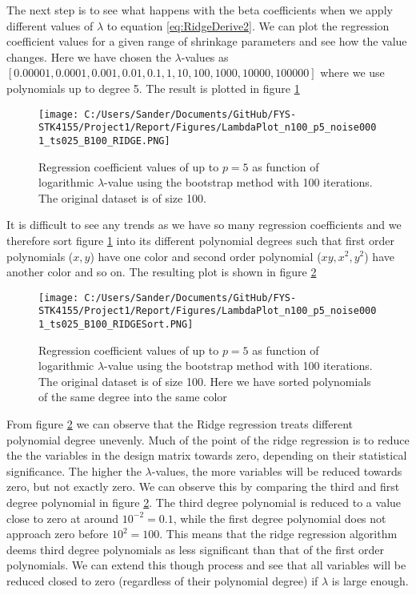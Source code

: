 \documentclass[12pt,a4paper]{article}
\begin{document}
\noindent The next step is to see what happens with the beta coefficients when we apply different values of $\lambda$ to equation \ref{eq:RidgeDerive2}. We can plot the regression coefficient values for a given range of shrinkage parameters and see how the value changes. Here we have chosen the $\lambda$-values as $[0.00001, 0.0001, 0.001, 0.01, 0.1, 1, 10, 100, 1000, 10000, 100000]$ where we use polynomials up to degree 5. The result is plotted in figure \ref{fig:LambdaPlot1}

\begin{figure}[H]
\centering
\texttt{[image: C:/Users/Sander/Documents/GitHub/FYS-STK4155/Project1/Report/Figures/LambdaPlot\_n100\_p5\_noise0001\_ts025\_B100\_RIDGE.PNG]}
\caption{\label{fig:LambdaPlot1} Regression coefficient values of up to $p = 5$ as function of logarithmic $\lambda$-value using the bootstrap method with 100 iterations. The original dataset is of size 100.}
\end{figure}

\noindent It is difficult to see any trends as we have so many regression coefficients and we therefore sort figure \ref{fig:LambdaPlot1} into its different polynomial degrees such that first order polynomials ($x,y$) have one color and second order polynomial ($xy,x^2,y^2$) have another color and so on. The resulting plot is shown in figure \ref{fig:LambdaPlot2}

\begin{figure}[H]
\centering
\texttt{[image: C:/Users/Sander/Documents/GitHub/FYS-STK4155/Project1/Report/Figures/LambdaPlot\_n100\_p5\_noise0001\_ts025\_B100\_RIDGESort.PNG]}
\caption{\label{fig:LambdaPlot2} Regression coefficient values of up to $p = 5$ as function of logarithmic $\lambda$-value using the bootstrap method with 100 iterations. The original dataset is of size 100. Here we have sorted polynomials of the same degree into the same color}
\end{figure}

\noindent From figure \ref{fig:LambdaPlot2} we can observe that the Ridge regression treats different polynomial degree unevenly. Much of the point of the ridge regression is to reduce the the variables in the design matrix towards zero, depending on their statistical significance. The higher the $\lambda$-values, the more variables will be reduced towards zero, but not exactly zero. We can observe this by comparing the third and first degree polynomial in figure \ref{fig:LambdaPlot2}. The third degree polynomial is reduced to a value close to zero at around $10^{-2} = 0.1$, while the first degree polynomial does not approach zero before $10^2 = 100$. This means that the ridge regression algorithm deems third degree polynomials as less significant than that of the first order polynomials. We can extend this though process and see that all variables will be reduced closed to zero (regardless of their polynomial degree) if $\lambda$ is large enough.
\end{document}
